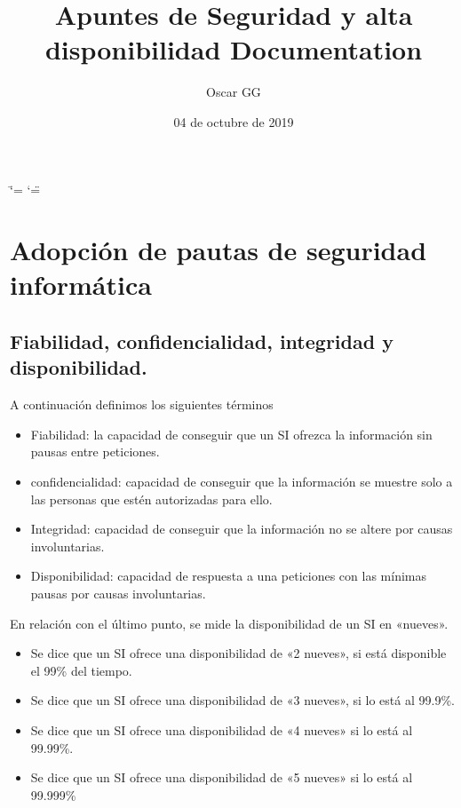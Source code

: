 \documentclass[letterpaper,10pt,spanish]{sphinxmanual}
\title{Apuntes de Seguridad y alta disponibilidad Documentation}
\date{04 de octubre de 2019}
\author{Oscar GG}
\begin{document}
\ifdefined\shorthandoff
  \ifnum\catcode`\=\string=\active\shorthandoff{=}\fi
  \ifnum\catcode`\"=\active{}\fi
\fi

\pagestyle{empty}
\sphinxmaketitle
\pagestyle{plain}
\sphinxtableofcontents
\pagestyle{normal}
\label{\detokenize{index::doc}}



\chapter{Adopción de pautas de seguridad informática}
\label{\detokenize{tema_pautas_seguridad_informatica/tema_pautas_seguridad_informatica:adopcion-de-pautas-de-seguridad-informatica}}\label{\detokenize{tema_pautas_seguridad_informatica/tema_pautas_seguridad_informatica::doc}}

\section{Fiabilidad, confidencialidad, integridad y disponibilidad.}
\label{\detokenize{tema_pautas_seguridad_informatica/tema_pautas_seguridad_informatica:fiabilidad-confidencialidad-integridad-y-disponibilidad}}
A continuación definimos los siguientes términos
\begin{itemize}
\item {} 
Fiabilidad: la capacidad de conseguir que un SI ofrezca la información sin pausas entre peticiones.

\item {} 
confidencialidad: capacidad de conseguir que la información se muestre solo a las personas que estén autorizadas para ello.

\item {} 
Integridad: capacidad de conseguir que la información no se altere por causas involuntarias.

\item {} 
Disponibilidad: capacidad de respuesta a una peticiones con las mínimas pausas por causas involuntarias.

\end{itemize}

En relación con el último punto, se mide la disponibilidad de un SI en «nueves».
\begin{itemize}
\item {} 
Se dice que un SI ofrece una disponibilidad de «2 nueves», si está disponible el 99\% del tiempo.

\item {} 
Se dice que un SI ofrece una disponibilidad de «3 nueves», si lo está al 99.9\%.

\item {} 
Se dice que un SI ofrece una disponibilidad de «4 nueves» si lo está al 99.99\%.

\item {} 
Se dice que un SI ofrece una disponibilidad de «5 nueves» si lo está al 99.999\%

\end{itemize}
\end{document}
